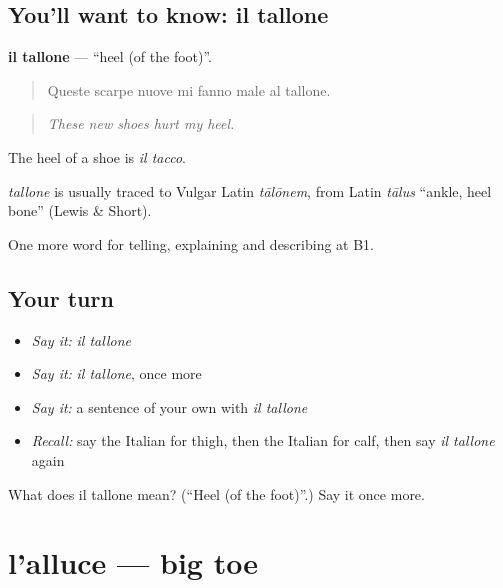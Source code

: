 \subsection*{You'll want to know: il tallone}
\textbf{il tallone} — \textquotedblleft{}heel (of the foot)\textquotedblright{}.

\begin{quote}
Queste scarpe nuove mi fanno male al tallone.
\end{quote}

\begin{quote}
\emph{These new shoes hurt my heel.}
\end{quote}

The heel of a shoe is \emph{il tacco}.

\begin{cousinweb}
\emph{tallone} is usually traced to Vulgar Latin \emph{tālōnem}, from Latin \emph{tālus} \textquotedblleft{}ankle, heel bone\textquotedblright{} (Lewis \& Short).
\end{cousinweb}

\begin{grammarlens}[title={What you've built}]
One more word for telling, explaining and describing at B1.
\end{grammarlens}

\subsection*{Your turn}
\begin{itemize}
\raggedright
  \item \emph{Say it:} \emph{il tallone}
  \item \emph{Say it:} \emph{il tallone}, once more
  \item \emph{Say it:} a sentence of your own with \emph{il tallone}
  \item \emph{Recall:} say the Italian for thigh, then the Italian for calf, then say \emph{il tallone} again
\end{itemize}

\begin{tcolorbox}[breakable,colback=teal!4,colframe=teal!35!black,title={Before you move on}]
What does il tallone mean? (\textquotedblleft{}Heel (of the foot)\textquotedblright{}.) Say it once more.
\end{tcolorbox}
\section[l'alluce]{l'alluce — big toe}

